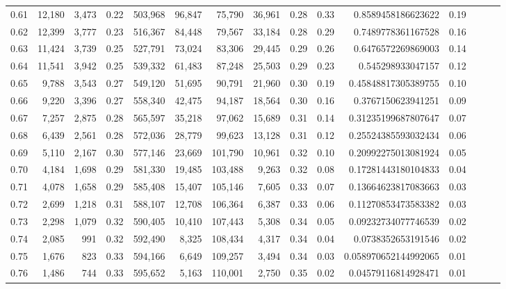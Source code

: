 \begin{tabular}{rrrrrrrrrrrrrrr}
0.61 &  12,180 &  3,473 &  0.22 &  503,968 &   96,847 &   75,790 &   36,961 &  0.28 &  0.33 &      0.8589458186623622 &      0.19 \\
0.62 &  12,399 &  3,777 &  0.23 &  516,367 &   84,448 &   79,567 &   33,184 &  0.28 &  0.29 &      0.7489778361167528 &      0.16 \\
0.63 &  11,424 &  3,739 &  0.25 &  527,791 &   73,024 &   83,306 &   29,445 &  0.29 &  0.26 &      0.6476572269869003 &      0.14 \\
0.64 &  11,541 &  3,942 &  0.25 &  539,332 &   61,483 &   87,248 &   25,503 &  0.29 &  0.23 &       0.545298933047157 &      0.12 \\
0.65 &   9,788 &  3,543 &  0.27 &  549,120 &   51,695 &   90,791 &   21,960 &  0.30 &  0.19 &     0.45848817305389755 &      0.10 \\
0.66 &   9,220 &  3,396 &  0.27 &  558,340 &   42,475 &   94,187 &   18,564 &  0.30 &  0.16 &      0.3767150623941251 &      0.09 \\
0.67 &   7,257 &  2,875 &  0.28 &  565,597 &   35,218 &   97,062 &   15,689 &  0.31 &  0.14 &     0.31235199687807647 &      0.07 \\
0.68 &   6,439 &  2,561 &  0.28 &  572,036 &   28,779 &   99,623 &   13,128 &  0.31 &  0.12 &     0.25524385593032434 &      0.06 \\
0.69 &   5,110 &  2,167 &  0.30 &  577,146 &   23,669 &  101,790 &   10,961 &  0.32 &  0.10 &     0.20992275013081924 &      0.05 \\
0.70 &   4,184 &  1,698 &  0.29 &  581,330 &   19,485 &  103,488 &    9,263 &  0.32 &  0.08 &     0.17281443180104833 &      0.04 \\
0.71 &   4,078 &  1,658 &  0.29 &  585,408 &   15,407 &  105,146 &    7,605 &  0.33 &  0.07 &     0.13664623817083663 &      0.03 \\
0.72 &   2,699 &  1,218 &  0.31 &  588,107 &   12,708 &  106,364 &    6,387 &  0.33 &  0.06 &     0.11270853473583382 &      0.03 \\
0.73 &   2,298 &  1,079 &  0.32 &  590,405 &   10,410 &  107,443 &    5,308 &  0.34 &  0.05 &     0.09232734077746539 &      0.02 \\
0.74 &   2,085 &    991 &  0.32 &  592,490 &    8,325 &  108,434 &    4,317 &  0.34 &  0.04 &      0.0738352653191546 &      0.02 \\
0.75 &   1,676 &    823 &  0.33 &  594,166 &    6,649 &  109,257 &    3,494 &  0.34 &  0.03 &    0.058970652144992065 &      0.01 \\
0.76 &   1,486 &    744 &  0.33 &  595,652 &    5,163 &  110,001 &    2,750 &  0.35 &  0.02 &     0.04579116814928471 &      0.01 \\

\end{tabular}
